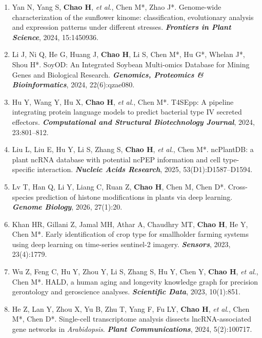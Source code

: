 {\begin{enumerate}[leftmargin=*, itemsep=1pt, parsep=0pt, topsep=0pt]
    \item Yan N, Yang S, \textbf{Chao H}, \textit{et al}., Chen M*, Zhao J*. 
    Genome-wide characterization of the sunflower kinome: classification, evolutionary analysis and expression patterns under different stresses. 
    \textbf{\textit{Frontiers in Plant Science}}, 2024, 15:1450936.

    \item Li J, Ni Q, He G, Huang J, \textbf{Chao H}, Li S, Chen M*, Hu G*, Whelan J*, Shou H*. 
    SoyOD: An Integrated Soybean Multi-omics Database for Mining Genes and Biological Research. 
    \textbf{\textit{Genomics, Proteomics \& Bioinformatics}}, 2024, 22(6):qzae080.

    \item Hu Y, Wang Y, Hu X, \textbf{Chao H}, \textit{et al}., Chen M*. 
    T4SEpp: A pipeline integrating protein language models to predict bacterial type IV secreted effectors. 
    \textbf{\textit{Computational and Structural Biotechnology Journal}}, 2024, 23:801--812.

    \item Liu L, Liu E, Hu Y, Li S, Zhang S, \textbf{Chao H}, \textit{et al}., Chen M*.
    ncPlantDB: a plant ncRNA database with potential ncPEP information and cell type-specific interaction. 
    \textbf{\textit{Nucleic Acids Research}}, 2025, 53(D1):D1587--D1594.

    \item Lv T, Han Q, Li Y, Liang C, Ruan Z, \textbf{Chao H}, Chen M, Chen D*. 
    Cross-species prediction of histone modifications in plants via deep learning. 
    \textbf{\textit{Genome Biology}}, 2026, 27(1):20.

    \item Khan HR, Gillani Z, Jamal MH, Athar A, Chaudhry MT, \textbf{Chao H}, He Y, Chen M*. 
    Early identification of crop type for smallholder farming systems using deep learning on time-series sentinel-2 imagery. 
    \textbf{\textit{Sensors}}, 2023, 23(4):1779.

    \item Wu Z, Feng C, Hu Y, Zhou Y, Li S, Zhang S, Hu Y, Chen Y, \textbf{Chao H}, \textit{et al}., Chen M*.
    HALD, a human aging and longevity knowledge graph for precision gerontology and geroscience analyses. 
    \textbf{\textit{Scientific Data}}, 2023, 10(1):851.

    \item He Z, Lan Y, Zhou X, Yu B, Zhu T, Yang F, Fu LY, \textbf{Chao H}, \textit{et al}., Chen M*, Chen D*. 
    Single-cell transcriptome analysis dissects lncRNA-associated gene networks in \textit{Arabidopsis}. 
    \textbf{\textit{Plant Communications}}, 2024, 5(2):100717.


\end{enumerate}}
